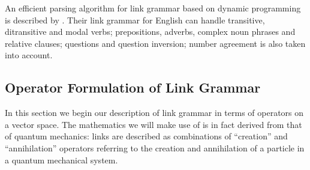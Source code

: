 An efficient parsing algorithm for link grammar based on dynamic programming is described by \cite{Sleator:91}. Their link grammar for English can handle transitive, ditransitive and modal verbs; prepositions, adverbs, complex noun phrases and relative clauses; questions and question inversion; number agreement is also taken into account.

\subsection{Operator Formulation of Link Grammar}
\label{operator-formulation-section}

In this section we begin our description of link grammar in terms of operators on a vector space. The mathematics we will make use of is in fact derived from that of quantum mechanics: links are described as combinations of ``creation'' and ``annihilation'' operators referring to the creation and annihilation of a particle in a quantum mechanical system.


